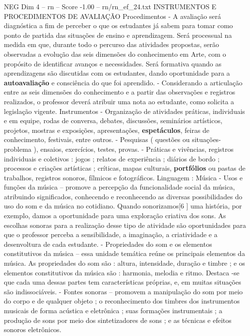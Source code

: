 \begin{textsample}{NEG Dim 4 – rn – Score -1.00 – rn/rn\_ef\_24.txt}  \label{ex:f4_neg_204}
INSTRUMENTOS E PROCEDIMENTOS DE AVALIAÇÃO Procedimentos - A avaliação será diagnóstica a fim de perceber o que os estudantes já sabem para tomar como ponto de partida das situações de ensino e aprendizagem.
Será processual na medida em que, durante todo o percurso das atividades propostas, serão observadas a evolução das seis dimensões do conhecimento em Arte, com o propósito de identificar avanços e necessidades.
Será formativa quando as aprendizagens são discutidas com os estudantes, dando oportunidade para a \textbf{autoavaliação} e consciência do que foi aprendido. - Considerando a articulação entre as seis dimensões do conhecimento e a partir das observações e registros realizados, o professor deverá atribuir uma nota ao estudante, como solicita a legislação vigente.
Instrumentos - Organização de atividades práticas, individuais e em equipe, rodas de conversa, debates, discussões, seminários artísticos, projetos, mostras e exposições, apresentações, \textbf{espetáculos}, feiras de conhecimento, festivais, entre outros. - Pesquisas ( questões ou situações-problema ), ensaios, exercícios, testes, provas. - Práticas e vivências, registros individuais e coletivos : jogos ; relatos de experiência ; diários de bordo ; processos e criações artísticas ; críticas, mapas culturais, \textbf{portfólios} ou pastas de trabalhos, registros sonoros, fílmicos e fotográficos.
Linguagem : Música - Usos e funções da música – promove a percepção da funcionalidade social da música, atribuindo significados, conhecendo e reconhecendo as diversas possibilidades do uso do som e da música no cotidiano.
Quando sonorizamos[6 ] uma história, por exemplo, damos a oportunidade para uma exploração criativa dos sons.
As escolhas sonoras para a realização desse tipo de atividade são oportunidades para que o professor perceba a sensibilidade, a imaginação, a criatividade e a desenvoltura de cada estudante. - Propriedades do som e os elementos constitutivos da música – essa unidade temática reúne os principais elementos da música.
As propriedades do som são : altura, intensidade, duração e timbre ; e os elementos constitutivos da música são : harmonia, melodia e ritmo.
Destaca -se que cada uma dessas partes tem características próprias, e, em muitas situações são indissociáveis. - Fontes sonoras – promovem a manipulação do som por meio do corpo e de qualquer objeto ; o reconhecimento dos timbres dos instrumentos musicais de forma acústica e eletrônica ; suas formações instrumentais ; a produção de sons por meio dos sintetizadores de sons ; e as técnicas e efeitos sonoros eletrônicos.

\end{textsample}
